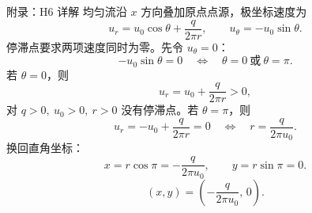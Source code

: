 \documentclass[aspectratio=169,10pt]{beamer}
\begin{document}
\begin{frame}{附录：H6 详解}
  \footnotesize
  \setlength{\abovedisplayskip}{2pt}
  \setlength{\belowdisplayskip}{2pt}
  \setlength{\abovedisplayshortskip}{1pt}
  \setlength{\belowdisplayshortskip}{1pt}
  均匀流沿 $x$ 方向叠加原点点源，极坐标速度为
  \[
    u_r=u_0\cos\theta+\frac{q}{2\pi r},
    \qquad
    u_\theta=-u_0\sin\theta. \tag{A23}
  \]
  停滞点要求两项速度同时为零。先令 $u_\theta=0$：
  \[
    -u_0\sin\theta=0
    \quad\Longleftrightarrow\quad
    \theta=0\ \text{或}\ \theta=\pi. \tag{A24}
  \]
  若 $\theta=0$，则
  \[
    u_r=u_0+\frac{q}{2\pi r}>0,
  \]
  对 $q>0,\ u_0>0,\ r>0$ 没有停滞点。若 $\theta=\pi$，则
  \[
    u_r=-u_0+\frac{q}{2\pi r}=0
    \quad\Longleftrightarrow\quad
    r=\frac{q}{2\pi u_0}. \tag{A25}
  \]
  换回直角坐标：
  \[
    x=r\cos\pi=-\frac{q}{2\pi u_0},
    \qquad
    y=r\sin\pi=0. \tag{A26}
  \]
  \[
    \boxed{(x,y)=\left(-\frac{q}{2\pi u_0},\,0\right).}
  \]
\end{frame}
\end{document}
